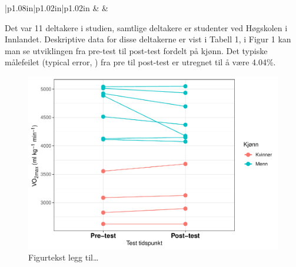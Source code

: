\documentclass[
]{book}
\begin{document}
\begin{longtable}[c]{|p{1.08in}|p{1.02in}|p{1.02in}}
 &  &  \\




\end{longtable}

Det var 11 deltakere i studien, samtlige deltakere er studenter ved Høgskolen i Innlandet. Deskriptive data for disse deltakerne er vist i Tabell 1, i Figur 1 kan man se utviklingen fra pre-test til post-test fordelt på kjønn. Det typiske målefeilet (typical error, \citep{hopkins2000}) fra pre til post-test er utregnet til å være 4.04\%.

\begin{figure}
\centering
\includegraphics{_main_files/figure-latex/Figur-1.pdf}
\caption{\label{fig:Figur}Figurtekst legg til\ldots{}}
\end{figure}
\end{document}
